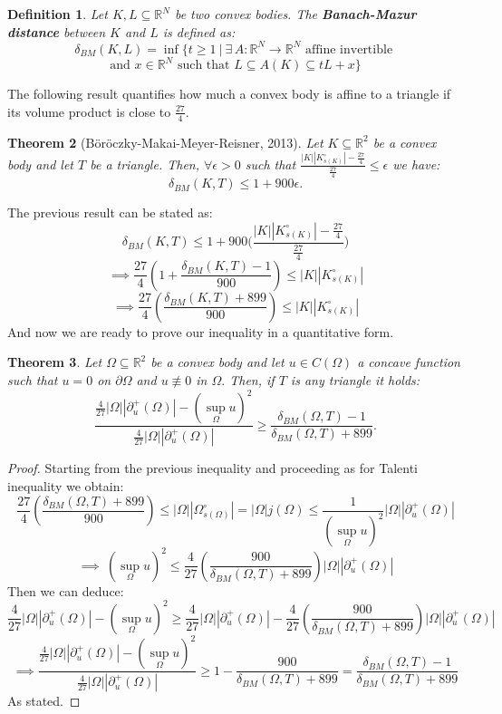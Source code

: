\documentclass{article}
\newtheorem{theorem}{Theorem}[section]
\newtheorem{definition}[theorem]{Definition}
\numberwithin{equation}{section}
\begin{document}
\begin{definition}
    Let $K, L \subseteq \mathbb{R}^N$ be two convex bodies. The \textbf{Banach-Mazur distance} between $K$ and $L$ is defined as:
    $$
    \delta_{BM}(K,L) = \inf \{ t \geq 1 \ \Big| \ \exists \, A: \mathbb{R}^N \to \mathbb{R}^N \text{ affine invertible }
    $$
    \begin{equation}
    \text{and }  x \in \mathbb{R}^N \text{ such that } L \subseteq A(K) \subseteq t L + x \}
    \end{equation}
\end{definition}
\noindent The following result quantifies how much a convex body is affine to a triangle if its volume product is close to $\frac{27}{4}$.
\begin{theorem}[B\"or\"oczky-Makai-Meyer-Reisner, 2013]
    Let $K \subseteq \mathbb{R}^2$ be a convex body and let $T$ be a triangle.
    Then, $\forall \epsilon >0$ such that $\frac{|K||K^\circ_{s(K)}|- \frac{27}{4}}{\frac{27}{4}}\leq \epsilon$ we have:
    $$\delta_{BM}(K,T) \leq 1+900 \epsilon.$$
\end{theorem}
\noindent The previous result can be stated as:
$$\delta_{BM}(K,T) \leq 1+900\big(\frac{|K||K^\circ_{s(K)}|- \frac{27}{4}}{\frac{27}{4}}\big)$$
$$\implies \frac{27}{4}\left(1 +   \frac{\delta_{BM}(K,T)-1}{900}\right)\leq |K||K^\circ_{s(K)}| $$
\begin{equation}
    \implies \frac{27}{4}\left(\frac{\delta_{BM}(K,T)+899}{900}\right)\leq |K||K^\circ_{s(K)}|
\end{equation}
\noindent And now we are ready to prove our inequality in a quantitative form.
\begin{theorem}
    Let $\Omega \subseteq \mathbb{R}^2$ be a convex body and let $u \in C(\Omega)$ a concave function such that $u=0$ on $\partial \Omega $ and $u\not\equiv0$ in $\Omega.$  Then, if $T$ is any triangle it holds:
    $$\frac{\frac{4}{27}|\Omega||\partial^+_u(\Omega)|-(\sup_\Omega u)^2}{\frac{4}{27}|\Omega||\partial^+_u(\Omega)|}\geq \frac{\delta_{BM}(\Omega, T)-1}{\delta_{BM}(\Omega,T)+899}.$$
\end{theorem}
\begin{proof}
Starting from the previous inequality and proceeding as for Talenti inequality we obtain:
$$ \frac{27}{4}\left(\frac{\delta_{BM}(\Omega,T)+899}{900}\right) \leq |\Omega||\Omega^\circ_{s(\Omega)}|=|\Omega|j(\Omega)\leq  \frac{1}{(\sup_\Omega u)^2}|\Omega||\partial^+_u(\Omega)|$$
$$ \implies \ (\sup_\Omega u)^2\leq \frac{4}{27}\left(\frac{900}{\delta_{BM}(\Omega, T)+899}\right)|\Omega||\partial^+_u(\Omega)|$$
Then we can deduce:
$$\frac{4}{27}|\Omega||\partial^+_u(\Omega)|-(\sup_\Omega u)^2\geq \frac{4}{27}|\Omega||\partial^+_u(\Omega)|-\frac{4}{27}\left(\frac{900}{\delta_{BM}(\Omega, T)+899}\right)|\Omega||\partial^+_u(\Omega)|$$
$$\implies \frac{\frac{4}{27}|\Omega||\partial^+_u(\Omega)|-(\sup_\Omega u)^2}{\frac{4}{27}|\Omega||\partial^+_u(\Omega)|}\geq 1 - \frac{900}{\delta_{BM}(\Omega, T)+899} = \frac{\delta_{BM}(\Omega, T)-1}{\delta_{BM}(\Omega,T)+899}$$
As stated.
\end{proof}
\end{document}
